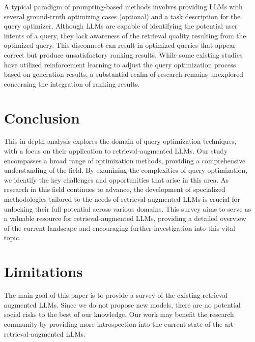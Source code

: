 \documentclass[11pt]{article}
\begin{document}
A typical paradigm of prompting-based methods involves providing LLMs with several ground-truth optimizing cases (optional) and a task description for the query optimizer. Although LLMs are capable of identifying the potential user intents of a query, they lack awareness of the retrieval quality resulting from the optimized query. This disconnect can result in optimized queries that appear correct but produce unsatisfactory ranking results. While some existing studies have utilized reinforcement learning to adjust the query optimization process based on generation results, a substantial realm of research remains unexplored concerning the integration of ranking results.


\section{Conclusion}\label{Conclusion}
This in-depth analysis explores the domain of query optimization techniques, with a focus on their application to retrieval-augmented LLMs. Our study encompasses a broad range of optimization methods, providing a comprehensive understanding of the field. By examining the complexities of query optimization, we identify the key challenges and opportunities that arise in this area. As research in this field continues to advance, the development of specialized methodologies tailored to the needs of retrieval-augmented LLMs is crucial for unlocking their full potential across various domains. This survey aims to serve as a valuable resource for retrieval-augmented LLMs, providing a detailed overview of the current landscape and encouraging further investigation into this vital topic.

\section{Limitations}\label{Limitations}

The main goal of this paper is to provide a survey of the existing retrieval-augmented LLMs. Since we do not propose new models, there are no potential social risks to the best of our knowledge. Our work may benefit the research community by providing more introspection into the current state-of-the-art retrieval-augmented LLMs.


\end{document}
